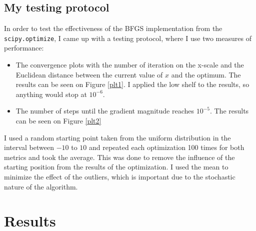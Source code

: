 \documentclass[a4paper]{article}
\begin{document}
\subsection{My testing protocol}
In order to test the effectiveness of the BFGS implementation from the
\texttt{scipy.optimize}, I came up with a testing protocol, where I use
two measures of performance:
\begin{itemize}
\item The convergence plots with the number of iteration on the x-scale and the
  Euclidean distance between the current value of $x$ and the
  optimum. The results can be seen on Figure \ref{plt1}. I applied the low shelf
  to the results, so anything would stop at $10^{-6}$.
\item The number of steps until the gradient magnitude reaches $10^{-5}$. The
  results can be seen on Figure \ref{plt2}
\end{itemize}
I used a random starting point taken from the uniform distribution in the
interval between $-10$ to $10$ and repeated each optimization 100 times for both
metrics and took the average. This was done to remove the influence of the
starting position from the results of the optimization. I used the mean 
to minimize the effect of the outliers,
which is important due to the stochastic nature of the algorithm. 


\section{Results}
\label{sec:conv}
\end{document}
